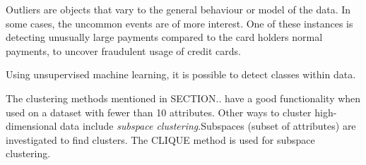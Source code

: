Outliers are objects that vary to the general behaviour or model of the data. In some cases, the uncommon events are of more interest. One of these instances is detecting unusually large payments compared to the card holders normal payments, to uncover fraudulent usage of credit cards.

Using unsupervised machine learning, it is possible to detect classes within data.

The clustering methods mentioned in SECTION.. have a good functionality when used on a dataset with fewer than 10 attributes.
Other ways to cluster high-dimensional data include \textit{subspace clustering}.Subspaces (subset of attributes) are investigated to find clusters. The CLIQUE method is used for subspace clustering.




